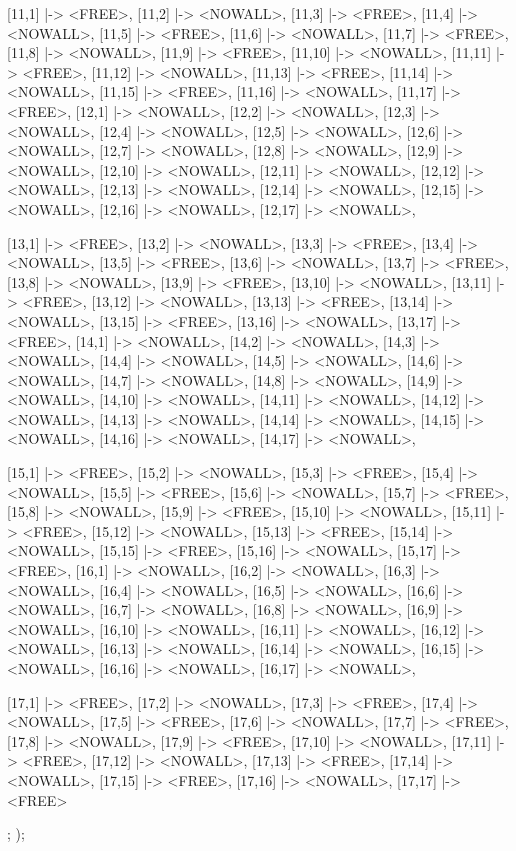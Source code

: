 \begin{vdmpp}[breaklines=true]
{     [11,1] |-> <FREE>, [11,2] |-> <NOWALL>, [11,3] |-> <FREE>, [11,4] |-> <NOWALL>, [11,5] |-> <FREE>, [11,6] |-> <NOWALL>, [11,7] |-> <FREE>, [11,8] |-> <NOWALL>, [11,9] |-> <FREE>, [11,10] |-> <NOWALL>, 
     [11,11] |-> <FREE>, [11,12] |-> <NOWALL>, [11,13] |-> <FREE>, [11,14] |-> <NOWALL>, [11,15] |-> <FREE>, [11,16] |-> <NOWALL>, [11,17] |-> <FREE>,
     [12,1] |-> <NOWALL>, [12,2] |-> <NOWALL>, [12,3] |-> <NOWALL>, [12,4] |-> <NOWALL>, [12,5] |-> <NOWALL>, [12,6] |-> <NOWALL>, [12,7] |-> <NOWALL>, [12,8] |-> <NOWALL>, [12,9] |-> <NOWALL>, [12,10] |-> <NOWALL>, 
     [12,11] |-> <NOWALL>, [12,12] |-> <NOWALL>, [12,13] |-> <NOWALL>, [12,14] |-> <NOWALL>, [12,15] |-> <NOWALL>, [12,16] |-> <NOWALL>, [12,17] |-> <NOWALL>,
   
     [13,1] |-> <FREE>, [13,2] |-> <NOWALL>, [13,3] |-> <FREE>, [13,4] |-> <NOWALL>, [13,5] |-> <FREE>, [13,6] |-> <NOWALL>, [13,7] |-> <FREE>, [13,8] |-> <NOWALL>, [13,9] |-> <FREE>, [13,10] |-> <NOWALL>, 
     [13,11] |-> <FREE>, [13,12] |-> <NOWALL>, [13,13] |-> <FREE>, [13,14] |-> <NOWALL>, [13,15] |-> <FREE>, [13,16] |-> <NOWALL>, [13,17] |-> <FREE>,
     [14,1] |-> <NOWALL>, [14,2] |-> <NOWALL>, [14,3] |-> <NOWALL>, [14,4] |-> <NOWALL>, [14,5] |-> <NOWALL>, [14,6] |-> <NOWALL>, [14,7] |-> <NOWALL>, [14,8] |-> <NOWALL>, [14,9] |-> <NOWALL>, [14,10] |-> <NOWALL>, 
     [14,11] |-> <NOWALL>, [14,12] |-> <NOWALL>, [14,13] |-> <NOWALL>, [14,14] |-> <NOWALL>, [14,15] |-> <NOWALL>, [14,16] |-> <NOWALL>, [14,17] |-> <NOWALL>,
  
     [15,1] |-> <FREE>, [15,2] |-> <NOWALL>, [15,3] |-> <FREE>, [15,4] |-> <NOWALL>, [15,5] |-> <FREE>, [15,6] |-> <NOWALL>, [15,7] |-> <FREE>, [15,8] |-> <NOWALL>, [15,9] |-> <FREE>, [15,10] |-> <NOWALL>, 
     [15,11] |-> <FREE>, [15,12] |-> <NOWALL>, [15,13] |-> <FREE>, [15,14] |-> <NOWALL>, [15,15] |-> <FREE>, [15,16] |-> <NOWALL>, [15,17] |-> <FREE>,
     [16,1] |-> <NOWALL>, [16,2] |-> <NOWALL>, [16,3] |-> <NOWALL>, [16,4] |-> <NOWALL>, [16,5] |-> <NOWALL>, [16,6] |-> <NOWALL>, [16,7] |-> <NOWALL>, [16,8] |-> <NOWALL>, [16,9] |-> <NOWALL>, [16,10] |-> <NOWALL>, 
     [16,11] |-> <NOWALL>, [16,12] |-> <NOWALL>, [16,13] |-> <NOWALL>, [16,14] |-> <NOWALL>, [16,15] |-> <NOWALL>, [16,16] |-> <NOWALL>, [16,17] |-> <NOWALL>,
     
     [17,1] |-> <FREE>, [17,2] |-> <NOWALL>, [17,3] |-> <FREE>, [17,4] |-> <NOWALL>, [17,5] |-> <FREE>, [17,6] |-> <NOWALL>, [17,7] |-> <FREE>, [17,8] |-> <NOWALL>, [17,9] |-> <FREE>, [17,10] |-> <NOWALL>, 
     [17,11] |-> <FREE>, [17,12] |-> <NOWALL>, [17,13] |-> <FREE>, [17,14] |-> <NOWALL>, [17,15] |-> <FREE>, [17,16] |-> <NOWALL>, [17,17] |-> <FREE>
   };
  );
  

\end{vdmpp}
